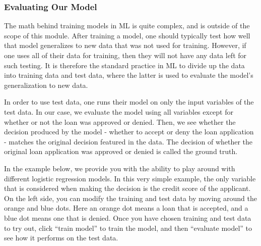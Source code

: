 \subsubsection{Evaluating Our Model}
\par The math behind training models in ML is quite complex, and is outside of the scope of this module. After training a model, one should typically test how well that model generalizes to new data that was not used for training. However, if one uses all of their data for training, then they will not have any data left for such testing. It is therefore the standard practice in ML to divide up the data into training data and test data, where the latter is used to evaluate the model’s generalization to new data.
\par In order to use test data, one runs their model on only the input variables of the test data. In our case, we evaluate the model using all variables except for whether or not the loan was approved or denied. Then, we see whether the decision produced by the model - whether to accept or deny the loan application - matches the original decision featured in the data. The decision of whether the original loan application was approved or denied is called the ground truth.
\par In the example below, we provide you with the ability to play around with different logistic regression models. In this very simple example, the only variable that is considered when making the decision is the credit score of the applicant. On the left side, you can modify the training and test data by moving around the orange and blue dots. Here an orange dot means a loan that is accepted, and a blue dot means one that is denied. Once you have chosen training and test data to try out, click “train model” to train the model, and then “evaluate model” to see how it performs on the test data.

\begin{visualComponent}
\end{visualComponent}

